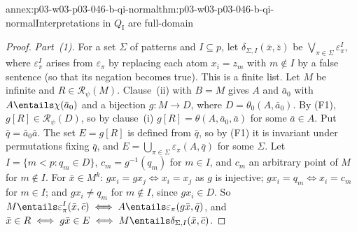 \begin{annexitem}{annex:p03-w03-p03-046-b-qi-normal}{thm:p03-w03-p03-046-b-qi-normal}{Interpretations in \(Q_{\mathrm I}\) are full-domain}
\begin{proof}
\emph{Part~(1).} For a set \(\Sigma\) of patterns and \(I\subseteq p\), let
\(\delta_{\Sigma,I}(\bar x,\bar z)\) be
\(\bigvee_{\pi\in\Sigma}\varepsilon^I_\pi\), where \(\varepsilon^I_\pi\)
arises from \(\varepsilon_\pi\) by replacing each atom \(x_i=z_m\) with
\(m\notin I\) by a false sentence (so that its negation becomes true). This
is a finite list. Let \(M\) be infinite and \(R\in\mathscr R_\psi(M)\).
Clause~(ii) with \(B=M\) gives \(A\) and \(\bar a_0\) with
\(A\entails\chi(\bar a_0)\) and a bijection \(g\colon M\to D\), where
\(D=\theta_0(A,\bar a_0)\). By (F1), \(g[R]\in\mathscr R_\psi(D)\), so by
clause~(i) \(g[R]=\theta(A,\bar a_0,\bar a)\) for some \(\bar a\in A\). Put
\(\bar q=\bar a_0\bar a\). The set \(E=g[R]\) is defined from \(\bar q\), so
by (F1) it is invariant under permutations fixing \(\bar q\), and
\(E=\bigcup_{\pi\in\Sigma}\varepsilon_\pi(A,\bar q)\) for some \(\Sigma\).
Let \(I=\{m<p:q_m\in D\}\), \(c_m=g^{-1}(q_m)\) for \(m\in I\), and \(c_m\)
an arbitrary point of \(M\) for \(m\notin I\). For \(\bar x\in M^k\):
\(gx_i=gx_j\iff x_i=x_j\) as \(g\) is injective; \(gx_i=q_m\iff x_i=c_m\)
for \(m\in I\); and \(gx_i\neq q_m\) for \(m\notin I\), since \(gx_i\in D\).
So \(M\entails\varepsilon^I_\pi(\bar x,\bar c)\iff
A\entails\varepsilon_\pi(g\bar x,\bar q)\), and \(\bar x\in R\iff g\bar x\in
E\iff M\entails\delta_{\Sigma,I}(\bar x,\bar c)\).


\end{proof}
\end{annexitem}
